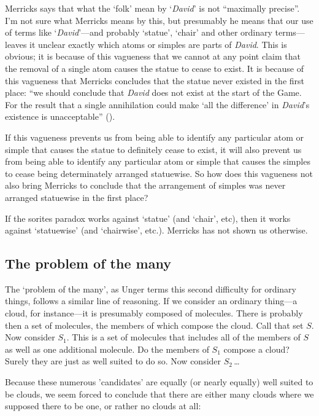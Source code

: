 \documentclass[11pt]{article}
\begin{document}
\begin{spacing}{1.5}
Merricks says that what the `folk' mean by `{\em David}' is not
``maximally precise''.  I'm not sure what Merricks means by this, but
presumably he means that our use of terms like `{\em David}'---and
probably `statue', `chair' and other ordinary terms---leaves it
unclear exactly which atoms or simples are parts of {\em David}.  This
is obvious; it is because of this vagueness that we cannot at any
point claim that the removal of a single atom causes the statue to
cease to exist.  It is because of this vagueness that Merricks
concludes that the statue never existed in the first place: ``we
should conclude that {\em David} does not exist at the start of the
Game.  For the result that a single annihilation could make `all the
difference' in {\em David}'s existence is unacceptable''
(\citeyear[33]{merricks2001a}).  

If this vagueness prevents us from being able to identify any
particular atom or simple that causes the statue to definitely cease
to exist, it will also prevent us from being able to identify any
particular atom or simple that causes the simples to cease being
determinately arranged statuewise.  So how does this vagueness not
also bring Merricks to conclude that the arrangement of simples was
never arranged statuewise in the first place?

If the sorites paradox works against `statue' (and `chair', etc), then
it works against `statuewise' (and `chairwise', etc.).  Merricks has
not shown us otherwise.

\subsection{The problem of the many}
\label{many}
The `problem of the many', as Unger terms this second difficulty for
ordinary things, follows a similar line of reasoning.  If we consider
an ordinary thing---a cloud, for instance---it is presumably composed
of molecules.  There is probably then a set of molecules, the members
of which compose the cloud.  Call that set $S$.  Now consider $S_1$.
This is a set of molecules that includes all of the members of $S$ as
well as one additional molecule.  Do the members of $S_1$ compose a
cloud?  Surely they are just as well suited to do so.  Now consider
$S_2$\,\ldots

Because these numerous 'candidates' are equally (or nearly equally)
well suited to be clouds, we seem forced to conclude that there are
either many clouds where we supposed there to be one, or rather no
clouds at all:


\end{spacing}
\end{document}
